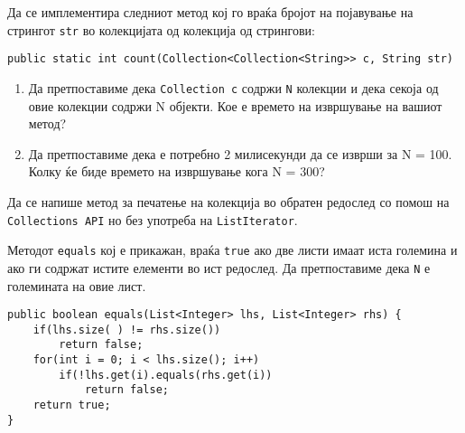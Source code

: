 

\lfoot{}
\cfoot{\thepage}
\rfoot{}
\usepackage{fancyvrb}
\usepackage{xcolor}
\usepackage{textcomp}


\begin{questions}


\renewcommand{\theenumi}{\alph{enumi}}

\question
Да се имплементира следниот метод кој го враќа бројот на појавување на стрингот
\texttt{str} во колекцијата од колекција од стрингови: 
\begin{lstlisting}
public static int count(Collection<Collection<String>> c, String str)
\end{lstlisting}
\begin{enumerate}
  \item Да претпоставиме дека \texttt{Collection c} содржи  \texttt{N} колекции
  и дека секоја од овие колекции содржи N објекти. Кое е времето на извршување
  на вашиот метод?
  \item Да претпоставиме дека е потребно 2 милисекунди да се изврши за N = 100.
  Колку ќе биде времето на извршување кога N = 300?
\end{enumerate}



\question

Да се напише метод за печатење на колекција во обратен редослед со помош на
\texttt{Collections API} но без употреба на \texttt{ListIterator}.



\question

Методот \texttt{equals} кој е прикажан, враќа \texttt{true} ако две листи имаат
иста големина и ако ги содржат истите елементи во ист редослед. Да
претпоставиме дека \texttt{N} е големината на овие лист.
\begin{lstlisting}
public boolean equals(List<Integer> lhs, List<Integer> rhs) {
    if(lhs.size( ) != rhs.size())
        return false;
    for(int i = 0; i < lhs.size(); i++)
        if(!lhs.get(i).equals(rhs.get(i))
            return false;
    return true;
}


\end{lstlisting}
\end{questions}
